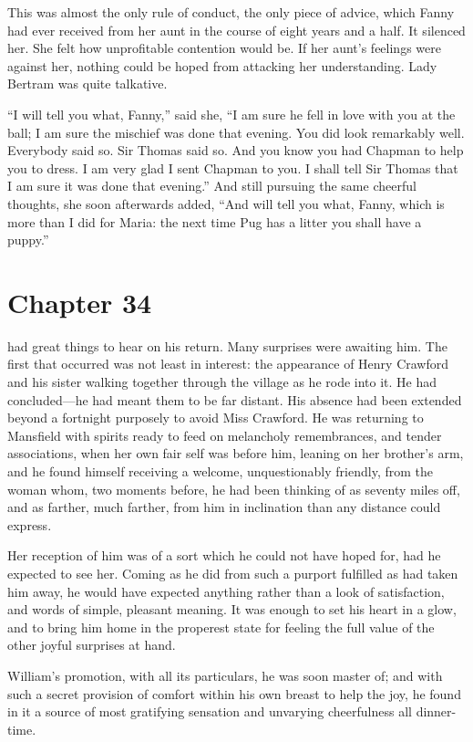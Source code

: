 This was almost the only rule of conduct, the only piece
of advice, which Fanny had ever received from her aunt
in the course of eight years and a half.  It silenced her.
She felt how unprofitable contention would be.
If her aunt's feelings were against her, nothing could
be hoped from attacking her understanding.  Lady Bertram
was quite talkative.

``I will tell you what, Fanny,'' said she, ``I am sure he
fell in love with you at the ball; I am sure the mischief
was done that evening.  You did look remarkably well.
Everybody said so.  Sir Thomas said so.  And you know
you had Chapman to help you to dress.  I am very glad
I sent Chapman to you.  I shall tell Sir Thomas that I
am sure it was done that evening.''  And still pursuing
the same cheerful thoughts, she soon afterwards added,
``And will tell you what, Fanny, which is more than I did
for Maria:  the next time Pug has a litter you shall have
a puppy.''



\chapter{Chapter 34}

 had great things to hear on his return.  Many surprises
were awaiting him.  The first that occurred was not least
in interest:  the appearance of Henry Crawford and his sister
walking together through the village as he rode into it.
He had concluded---he had meant them to be far distant.
His absence had been extended beyond a fortnight purposely
to avoid Miss Crawford.  He was returning to Mansfield
with spirits ready to feed on melancholy remembrances,
and tender associations, when her own fair self was
before him, leaning on her brother's arm, and he found
himself receiving a welcome, unquestionably friendly,
from the woman whom, two moments before, he had been
thinking of as seventy miles off, and as farther,
much farther, from him in inclination than any distance
could express.

Her reception of him was of a sort which he could not
have hoped for, had he expected to see her.  Coming as he
did from such a purport fulfilled as had taken him away,
he would have expected anything rather than a look
of satisfaction, and words of simple, pleasant meaning.
It was enough to set his heart in a glow, and to bring him
home in the properest state for feeling the full value
of the other joyful surprises at hand.

William's promotion, with all its particulars, he was soon
master of; and with such a secret provision of comfort
within his own breast to help the joy, he found in it
a source of most gratifying sensation and unvarying
cheerfulness all dinner-time.

